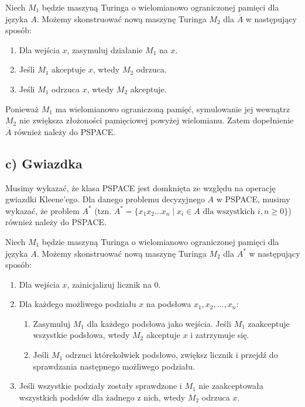 \documentclass{article}
\begin{document}
Niech $M_1$ będzie maszyną Turinga o wielomianowo ograniczonej pamięci dla języka $A$. Możemy skonstruować nową maszynę Turinga $M_2$ dla $\overline{A}$ w następujący sposób:

\begin{enumerate}
    \item Dla wejścia $x$, zasymuluj działanie $M_1$ na $x$.
    \item Jeśli $M_1$ akceptuje $x$, wtedy $M_2$ odrzuca.
    \item Jeśli $M_1$ odrzuca $x$, wtedy $M_2$ akceptuje.
\end{enumerate}

Ponieważ $M_1$ ma wielomianowo ograniczoną pamięć, symulowanie jej wewnątrz $M_2$ nie zwiększa złożoności pamięciowej powyżej wielomianu. Zatem dopełnienie $\overline{A}$ również należy do PSPACE.

\subsection*{c) Gwiazdka }
Musimy wykazać, że klasa PSPACE jest domknięta ze względu na operację gwiazdki Kleene'ego.
Dla danego problemu decyzyjnego $A$ w PSPACE, musimy wykazać, że problem $A^*$ (tzn. $A^* = \{x_1 x_2 \dots x_n \mid x_i \in A \text{ dla wszystkich } i, n \ge 0\}$) również należy do PSPACE.

Niech $M_1$ będzie maszyną Turinga o wielomianowo ograniczonej pamięci dla języka $A$. Możemy skonstruować nową maszynę Turinga $M_2$ dla $A^*$ w następujący sposób:

\begin{enumerate}
    \item Dla wejścia $x$, zainicjalizuj licznik na 0.
    \item Dla każdego możliwego podziału $x$ na podsłowa $x_1, x_2, \dots, x_n$:
    \begin{enumerate}
        \item Zasymuluj $M_1$ dla każdego podsłowa jako wejścia. Jeśli $M_1$ zaakceptuje wszystkie podsłowa, wtedy $M_2$ akceptuje $x$ i zatrzymuje się.
        \item Jeśli $M_1$ odrzuci którekolwiek podsłowo, zwiększ licznik i przejdź do sprawdzania następnego możliwego podziału.
    \end{enumerate}
    \item Jeśli wszystkie podziały zostały sprawdzone i $M_1$ nie zaakceptowała wszystkich podsłów dla żadnego z nich, wtedy $M_2$ odrzuca $x$.
\end{enumerate}
\end{document}
